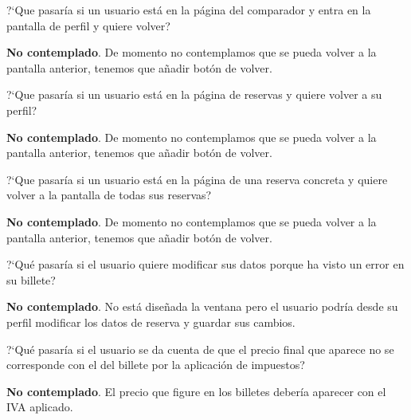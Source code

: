 \begin{escenario} %
      \centering
      ?`Que pasaría si un usuario está en la página del comparador y entra en la pantalla de perfil y quiere volver?

      \begin{solucion} \centering
            \textbf{No contemplado}. De momento no contemplamos que se pueda volver a la pantalla anterior, tenemos que añadir botón de volver.
      \end{solucion}
\end{escenario}

\begin{escenario} %
      \centering
      ?`Que pasaría si un usuario está en la página de reservas y quiere volver a su perfil?

      \begin{solucion} \centering
            \textbf{No contemplado}. De momento no contemplamos que se pueda volver a la pantalla anterior, tenemos que añadir botón de volver.
      \end{solucion}
\end{escenario}

\begin{escenario} %
      \centering
      ?`Que pasaría si un usuario está en la página de una reserva concreta y quiere volver a la pantalla de todas sus reservas?

      \begin{solucion} \centering
            \textbf{No contemplado}. De momento no contemplamos que se pueda volver a la pantalla anterior, tenemos que añadir botón de volver.
      \end{solucion}
\end{escenario}

\begin{escenario} %
      \centering
      ?`Qué pasaría si el usuario quiere modificar sus datos porque ha visto un error en su billete?

      \begin{solucion} \centering
            \textbf{No contemplado}.  No está diseñada la ventana pero el usuario podría desde su perfil modificar los datos de reserva y guardar sus cambios.
      \end{solucion}
\end{escenario}

\begin{escenario} %
      \centering
      ?`Qué pasaría si el usuario se da cuenta de que el precio final que aparece no se corresponde con el del billete por la aplicación de impuestos?

      \begin{solucion} \centering
            \textbf{No contemplado}. El precio que figure en los billetes debería aparecer con el IVA aplicado.

      \end{solucion}
\end{escenario}

